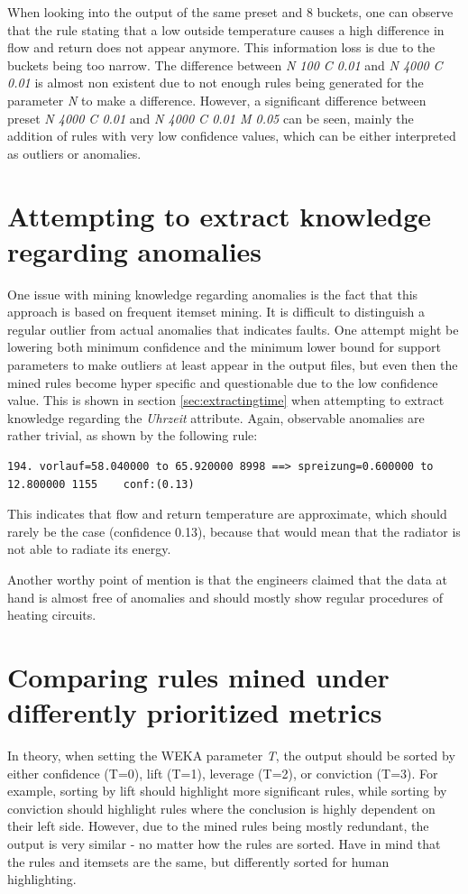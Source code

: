 \documentclass[bachelor,english]{info1thesis}
\begin{document}
When looking into the output of the same preset and 8 buckets, one can observe that the rule stating that a low outside temperature causes a high difference in flow and return does not appear anymore. This information loss is due to the buckets being too narrow. The difference between \textit{N 100 C 0.01} and \textit{N 4000 C 0.01} is almost non existent due to not enough rules being generated for the parameter \textit{N} to make a difference. However, a significant difference between preset \textit{N 4000 C 0.01} and \textit{N 4000 C 0.01 M 0.05} can be seen, mainly the addition of rules with very low confidence values, which can be either interpreted as outliers or anomalies.



\section{Attempting to extract knowledge regarding anomalies}
\label{sec:extractinganomalies}
One issue with mining knowledge regarding anomalies is the fact that this approach is based on frequent itemset mining. It is difficult to distinguish a regular outlier from actual anomalies that indicates faults. One attempt might be lowering both minimum confidence and the minimum lower bound for support parameters to make outliers at least appear in the output files, but even then the mined rules become hyper specific and questionable due to the low confidence value. This is shown in section \ref{sec:extractingtime} when attempting to extract knowledge regarding the \textit{Uhrzeit} attribute.
Again, observable anomalies are rather trivial, as shown by the following rule:


\begin{lstlisting}[style=arff, caption=rule indicating irregular behavior]
194. vorlauf=58.040000 to 65.920000 8998 ==> spreizung=0.600000 to 12.800000 1155    conf:(0.13)
\end{lstlisting}

This indicates that flow and return temperature are approximate, which should rarely be the case (confidence 0.13), because that would mean that the radiator is not able to radiate its energy.

Another worthy point of mention is that the engineers claimed that the data at hand is almost free of anomalies and should mostly show regular procedures of heating circuits.

\section{Comparing rules mined under differently prioritized metrics}
\label{sec:sorting}
In theory, when setting the WEKA parameter \textit{T}, the output should be sorted by either confidence (T=0), lift (T=1), leverage (T=2), or conviction (T=3). For example, sorting by lift should highlight more significant rules, while sorting by conviction should highlight rules where the conclusion is highly dependent on their left side. However, due to the mined rules being mostly redundant, the output is very similar - no matter how the rules are sorted. Have in mind that the rules and itemsets are the same, but differently sorted for human highlighting.
\end{document}
